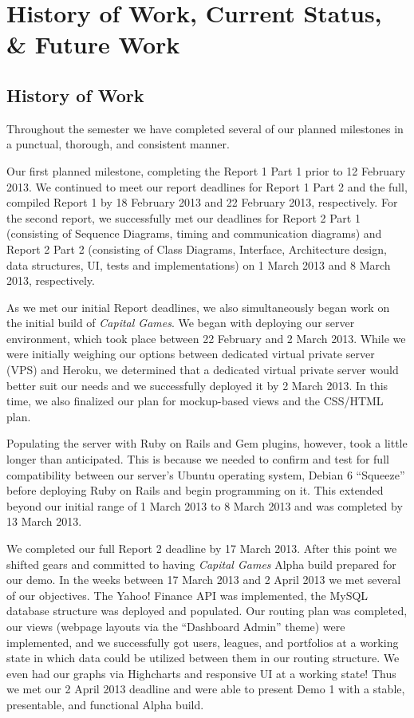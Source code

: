 \chapter{History of Work, Current Status, \& Future Work}

\section{History of Work}

Throughout the semester we have completed several of our planned milestones in a punctual, thorough, and consistent manner.

Our first planned milestone, completing the Report 1 Part 1 prior to 12 February 2013. 
We continued to meet our report deadlines for Report 1 Part 2 and the full, 
compiled Report 1 by 18 February 2013 and 22 February 2013, respectively. 
For the second report, we successfully met our deadlines for Report 2 Part 1 
(consisting of Sequence Diagrams, timing and communication diagrams) 
and Report 2 Part 2 (consisting of Class Diagrams, Interface, Architecture 
design, data structures, UI, tests and implementations) 
on 1 March 2013 and 8 March 2013, respectively.

As we met our initial Report deadlines, we also simultaneously 
began work on the initial build of \textit{Capital Games}. We began with 
deploying our server environment, which took place between 22 February 
and 2 March 2013. While we were initially weighing our options between 
dedicated virtual private server (VPS) and Heroku, we determined that 
a dedicated virtual private server would better suit our needs and we 
successfully deployed it by 2 March 2013. In this time, we also finalized 
our plan for mockup-based views and the CSS/HTML plan. 

Populating the server with Ruby on Rails and Gem plugins, however, 
took a little longer than anticipated. This is because we needed to 
confirm and test for full compatibility between our server's Ubuntu 
operating system, Debian 6 ``Squeeze'' before deploying Ruby on 
Rails and begin programming on it. This extended beyond our initial 
range of 1 March 2013 to 8 March 2013 and was completed by 13 March 2013.

We completed our full Report 2 deadline by 17 March 2013. After this point 
we shifted gears and committed to having \textit{Capital Games} Alpha build 
prepared for our demo. In the weeks between 17 March 2013 and 2 April 2013 
we met several of our objectives. The Yahoo! Finance API was implemented, 
the MySQL database structure was deployed and populated. Our routing plan 
was completed, our views (webpage layouts via the ``Dashboard Admin'' theme) 
were implemented, and we successfully got users, leagues, and portfolios 
at a working state in which data could be utilized between them in our 
routing structure. We even had our graphs via Highcharts and responsive
UI at a working state! Thus we met our 2 April 2013 deadline and were able 
to present Demo 1 with a stable, presentable, and functional Alpha build. 

